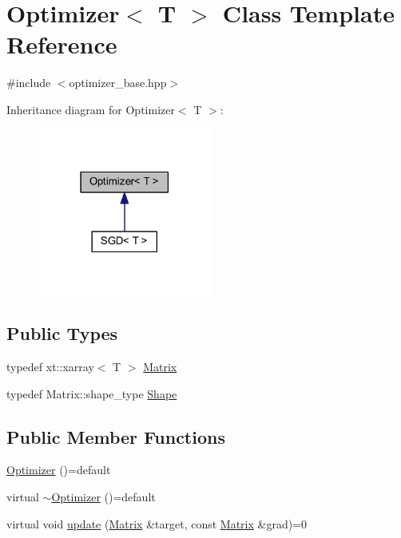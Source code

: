 \hypertarget{class_optimizer}{}\section{Optimizer$<$ T $>$ Class Template Reference}
\label{class_optimizer}


{\ttfamily \#include $<$optimizer\+\_\+base.\+hpp$>$}



Inheritance diagram for Optimizer$<$ T $>$\+:\nopagebreak
\begin{figure}[H]
\begin{center}
\leavevmode
\includegraphics[width=162pt]{class_optimizer__inherit__graph}
\end{center}
\end{figure}
\subsection*{Public Types}
\begin{DoxyCompactItemize}
\item 
typedef xt\+::xarray$<$ T $>$ \mbox{\hyperlink{class_optimizer_a1fa5c63152a16b8ff94df2d66e3a7a97}{Matrix}}
\item 
typedef Matrix\+::shape\+\_\+type \mbox{\hyperlink{class_optimizer_a95929960c606690f519e24f3ed8e1ab9}{Shape}}
\end{DoxyCompactItemize}
\subsection*{Public Member Functions}
\begin{DoxyCompactItemize}
\item 
\mbox{\hyperlink{class_optimizer_aaea376789a8baff0af7d215818b61bf6}{Optimizer}} ()=default
\item 
virtual \mbox{\hyperlink{class_optimizer_a1608fe90b2559c048f7d7e94ba4cf2f2}{$\sim$\+Optimizer}} ()=default
\item 
virtual void \mbox{\hyperlink{class_optimizer_a3f4859896cf9edab31b3875af7aad0cd}{update}} (\mbox{\hyperlink{class_optimizer_a1fa5c63152a16b8ff94df2d66e3a7a97}{Matrix}} \&target, const \mbox{\hyperlink{class_optimizer_a1fa5c63152a16b8ff94df2d66e3a7a97}{Matrix}} \&grad)=0
\end{DoxyCompactItemize}
